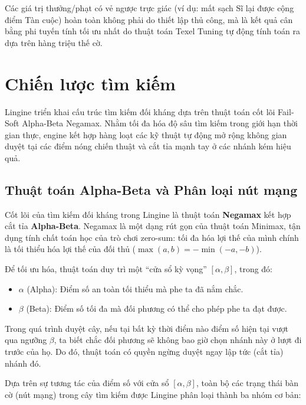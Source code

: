 Các giá trị thưởng/phạt có vẻ ngược trực giác (ví dụ: mất sạch Sĩ lại được cộng điểm Tàn cuộc) hoàn toàn không phải do thiết lập thủ công, mà là kết quả cân bằng phi tuyến tính tối ưu nhất do thuật toán Texel Tuning tự động tính toán ra dựa trên hàng triệu thế cờ.

\section{Chiến lược tìm kiếm}

Lingine triển khai cấu trúc tìm kiếm đối kháng dựa trên thuật toán cốt lõi Fail-Soft Alpha-Beta Negamax. Nhằm tối đa hóa độ sâu tìm kiếm trong giới hạn thời gian thực, engine kết hợp hàng loạt các kỹ thuật tự động mở rộng không gian duyệt tại các điểm nóng chiến thuật và cắt tỉa mạnh tay ở các nhánh kém hiệu quả.

\subsection{Thuật toán Alpha-Beta và Phân loại nút mạng}

Cốt lõi của tìm kiếm đối kháng trong Lingine là thuật toán \textbf{Negamax} kết hợp cắt tỉa \textbf{Alpha-Beta}. Negamax là một dạng rút gọn của thuật toán Minimax, tận dụng tính chất toán học của trò chơi zero-sum: tối đa hóa lợi thế của mình chính là tối thiểu hóa lợi thế của đối thủ ($\max(a, b) = -\min(-a, -b)$). 

Để tối ưu hóa, thuật toán duy trì một ``cửa sổ kỳ vọng'' $[\alpha, \beta]$, trong đó:
\begin{itemize}
    \item $\alpha$ (Alpha): Điểm số an toàn tối thiểu mà phe ta đã nắm chắc.
    \item $\beta$ (Beta): Điểm số tối đa mà đối phương có thể cho phép phe ta đạt được.
\end{itemize}
Trong quá trình duyệt cây, nếu tại bất kỳ thời điểm nào điểm số hiện tại vượt qua ngưỡng $\beta$, ta biết chắc đối phương sẽ không bao giờ chọn nhánh này ở lượt đi trước của họ. Do đó, thuật toán có quyền ngừng duyệt ngay lập tức (cắt tỉa) nhánh đó.

Dựa trên sự tương tác của điểm số với cửa sổ $[\alpha, \beta]$, toàn bộ các trạng thái bàn cờ (nút mạng) trong cây tìm kiếm được Lingine phân loại thành ba nhóm cơ bản:

